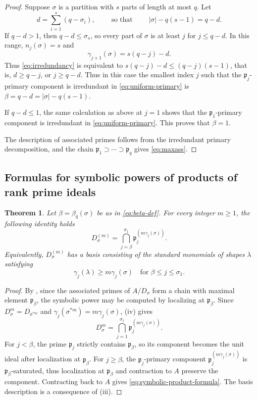 \documentclass[11pt,reqno]{amsart}
\numberwithin{equation}{subsection}
\newtheorem{theorem}[equation]{Theorem}
\theoremstyle{definition}
\theoremstyle{remark}
\newcommand{\fp}{\mathfrak p}
\begin{document}
\begin{proof}
Suppose $\sigma$ is a partition with $s$ parts of length at most $q$. Let
\[
 d=\sum_{i=1}^{s}(q-\sigma_i),
 \qquad \text{ so that } \qquad
 |\sigma|-q(s-1)=q-d.
\]
If $q-d>1$, then $q-d\le\sigma_s$, so every part of $\sigma$ is at
least $j$ for $j\le q-d$.  In this range, $n_j(\sigma)=s$ and 
\[
 \gamma_{j+1}(\sigma)
 =s(q-j)-d.
\]
Thus \eqref{eq:irredundancy} is equivalent to $ s(q-j)-d \leq (q-j)(s-1)$, that is, 
$d\ge q-j$, or $j\ge q-d$.  Thus in this case the smallest index $j$ such that the $\fp_j$-primary component is irredundant in \eqref{eq:uniform-primary} is $\beta=q-d=|\sigma|-q(s-1)$.

If $q-d\le1$, the same calculation as above at
$j=1$ shows that the $\fp_1$-primary component is irredundant in \eqref{eq:uniform-primary}.  This proves that
$\beta=1$.  

The description of associated
primes follows from the irredundant primary decomposition, and the
chain $\fp_1\supset\cdots\supset\fp_q$ gives \eqref{eq:maxass}.
\end{proof}



\subsection{Formulas for symbolic powers of products of rank prime ideals}

\begin{theorem}\label{thm:symbolic-powers}
Let $\beta=\beta_q(\sigma)$ be as in \eqref{eq:beta-def}. For every integer $m\ge1$, the following identity holds
\begin{equation}\label{eq:symbolic-product-formula}
 D_\sigma^{(m)}
 =\bigcap_{j=\beta}^{\sigma_1}
 \fp_j^{(m\gamma_j(\sigma))}.
\end{equation}
Equivalently, $D_\sigma^{(m)}$ has a basis consisting of the standard
monomials of shapes $\lambda$ satisfying
\begin{equation}\label{eq:symbolic-shape-ineq}
 \gamma_j(\lambda)\ge m\gamma_j(\sigma)
 \quad\text{for }\beta\le j\le\sigma_1.
\end{equation}
\end{theorem}

\begin{proof}
By , since the associated primes of $A/D_\sigma$ form a chain with maximal element $\fp_\beta$, the symbolic power may be computed by localizing
at $\fp_\beta$.  Since
$D_\sigma^m=D_{\sigma^{*m}}$ and $\gamma_j(\sigma^{*m})=m\gamma_j(\sigma)$, (iv) gives
\[
 D_\sigma^m
 =\bigcap_{j=1}^{\sigma_1}
 \fp_j^{(m\gamma_j(\sigma))}.
\]
For $j<\beta$, the prime $\fp_j$ strictly contains $\fp_\beta$, so its
component becomes the unit ideal after localization at $\fp_\beta$.
For $j\ge\beta$, the $\fp_j$-primary component  $\fp_j^{(m\gamma_j(\sigma))}$ is $\fp_\beta$-saturated, thus localization at $\fp_\beta$ and contraction to $A$ preserve the component.
Contracting back to $A$ gives \eqref{eq:symbolic-product-formula}.
The basis description is a consequence of (iii).
\end{proof}
\end{document}
